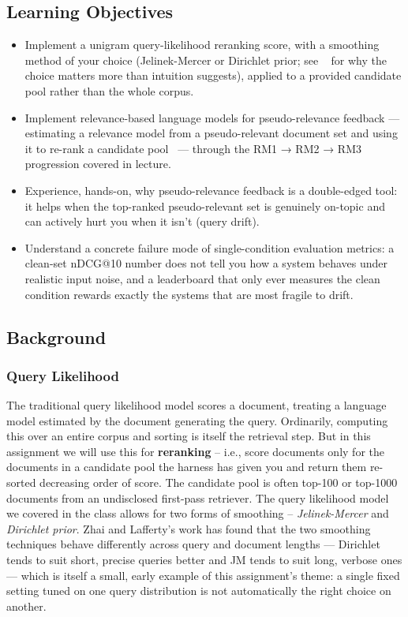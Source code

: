 \documentclass[10pt]{article}
\begin{document}
\subsection{Learning Objectives}
\begin{itemize}
\item Implement a unigram query-likelihood reranking score, with a smoothing method of your choice (Jelinek-Mercer or Dirichlet prior; see ~\cite{zhailafferty2001} for why the choice matters more than intuition suggests), applied to a provided candidate pool rather than the whole corpus.
\item Implement relevance-based language models for pseudo-relevance feedback — estimating a relevance model from a pseudo-relevant document set and using it to re-rank a candidate pool~\cite{lavrenkocroft2001} — through the RM1 → RM2 → RM3 progression covered in lecture.
\item Experience, hands-on, why pseudo-relevance feedback is a double-edged tool: it helps when the top-ranked pseudo-relevant set is genuinely on-topic and can actively hurt you when it isn't (query drift).
\item Understand a concrete failure mode of single-condition evaluation metrics: a clean-set nDCG@10 number does not tell you how a system behaves under realistic input noise, and a leaderboard that only ever measures the clean condition rewards exactly the systems that are most fragile to drift.

\end{itemize}

\subsection{Background} 
\subsubsection{Query Likelihood}
The traditional query likelihood model scores a document, treating a language model estimated by the document generating the query. Ordinarily, computing this over an entire corpus and sorting is itself the retrieval step. But in this assignment we will use this for \textbf{reranking} -- i.e., score documents only for the documents in a candidate pool the harness has given you and return them re-sorted decreasing order of score. The candidate pool is often top-100 or top-1000 documents from an undisclosed first-pass retriever. The query likelihood model we covered in the class allows for two forms of smoothing -- \emph{Jelinek-Mercer} and \emph{Dirichlet prior}. Zhai and Lafferty's work has found that the two smoothing techniques behave differently across query and document lengths — Dirichlet tends to suit short, precise queries better and JM tends to suit long, verbose ones — which is itself a small, early example of this assignment's theme: a single fixed setting tuned on one query distribution is not automatically the right choice on another.
\end{document}
